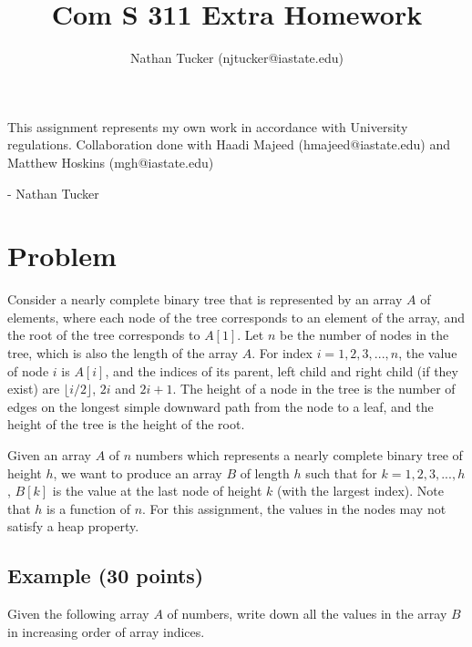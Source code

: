 \documentclass[11pt]{amsart}
\begin{document}
\pagestyle{plain}

\title{Com S 311 Extra Homework}
\author{Nathan Tucker (njtucker@iastate.edu)}
\maketitle

\doublespacing

\vspace{10mm}

\vfill
\begin{flushright}
This assignment represents my own work in accordance with University regulations. Collaboration done with Haadi Majeed (hmajeed@iastate.edu) and Matthew Hoskins (mgh@iastate.edu)

- Nathan Tucker
\end{flushright}
\newpage
\vspace{-.8cm}

\section*{Problem}

Consider a nearly complete binary tree that is represented by an array $A$ of elements,
where each node of the tree corresponds to an element of the array,
and the root of the tree corresponds to $A[1]$. Let $n$ be the number of nodes
in the tree, which is also the length of the array $A$.
For index $i = 1, 2, 3, ..., n$, the value of node $i$ is $A[i]$,
and the indices of its parent, left child and right child (if they exist)
are $\lfloor{i/2}\rfloor$, $2i$ and $2i+1$.
The height of a node in the tree is the number of edges on the longest
simple downward path from the node to a leaf, and the height of
the tree is the height of the root.

Given an array $A$ of $n$ numbers which represents a nearly complete binary tree
of height $h$, we want to produce an array $B$ of length $h$ such that
for $k = 1, 2, 3, ..., h$, $B[k]$ is the value at the last node of height $k$
(with the largest index). Note that $h$ is a function of $n$.
For this assignment, the values in the nodes may not satisfy a heap property.

\subsection*{Example (30 points)}

Given the following array $A$ of numbers, write down all the values
in the array $B$ in increasing order of array indices.
\end{document}
